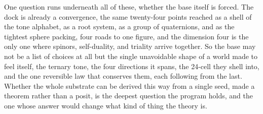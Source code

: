 One question runs underneath all of these, whether the base itself is forced. The dock is already a convergence, the same twenty-four points reached as a shell of the tone alphabet, as a root system, as a group of quaternions, and as the tightest sphere packing, four roads to one figure, and the dimension four is the only one where spinors, self-duality, and triality arrive together. So the base may not be a list of choices at all but the single unavoidable shape of a world made to feel itself, the ternary tone, the four directions it spans, the 24-cell they shell into, and the one reversible law that conserves them, each following from the last. Whether the whole substrate can be derived this way from a single seed, made a theorem rather than a posit, is the deepest question the program holds, and the one whose answer would change what kind of thing the theory is.
